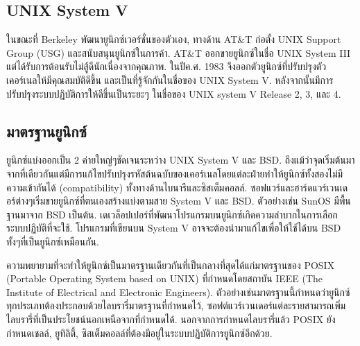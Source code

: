 \begin{thwbr}
{{\subsection{UNIX System V}
ในขณะที่ Berkeley พัฒนายูนิกซ์เวอร์ชั่นของตัวเอง, ทางด้าน AT\&T ก่อตั้ง UNIX Support Group (USG) และสนับสนุนยูนิกซ์ในการค้า. AT\&T ออกขายยูนิกซ์ในชื่อ UNIX System III แต่ได้รับการต้อนรับไม่สู้ดีนักเนื่องจากคุณภาพ. ในปีค.ศ. 1983 จึงออกตัวยูนิกซ์ที่ปรับปรุงตัวเคอร์เนลให้มีคุณสมบัติดีขึ้น และเป็นที่รู้จักกันในชื่อของ UNIX System V. หลังจากนั้นมีการปรับปรุงระบบปฏิบัติการให้ดีขึ้นเป็นระยะๆ ในชื่อของ UNIX system V Release 2, 3, และ 4.


\subsection{มาตรฐานยูนิกซ์}
ยูนิกซ์แบ่งออกเป็น 2 ค่ายใหญ่ๆชัดเจนระหว่าง UNIX System V และ BSD. ถึงแม้ว่าจุดเริ่มต้นมาจากที่เดียวกันแต่มีการแก้ไขปรับปรุงรหัสต้นฉบับของเคอร์เนลโดยแต่ละฝ่ายทำให้ยูนิกซ์ทั้งสองไม่มีความเข้ากันได้ (compatibility) ทั้งทางด้านไบนารีและซิสเต็มคอลล์. ซอฟแวร์และฮาร์ดแวร์เวนเดอร์ต่างๆเริ่มขายยูนิกซ์ที่ตนเองสร้างแบ่งตามสาย System V และ BSD. ตัวอย่างเช่น SunOS มีพื้นฐานมาจาก BSD เป็นต้น. เดเวล็อปเปอร์ที่พัฒนาโปรแกรมบนยูนิกซ์เกิดความลำบากในการเลือกระบบปฏิบัติที่จะใช้. โปรแกรมที่เขียนบน System V อาจจะต้องนำมาแก้ไขเพื่อให้ใช้ได้บน BSD ทั้งๆที่เป็นยูนิกซ์เหมือนกัน. 

ความพยายามที่จะทำให้ยูนิกซ์เป็นมาตรฐานเดียวกันที่เป็นกลางที่สุดได้แก่มาตรฐานของ POSIX (Portable Operating System based on UNIX) ที่กำหนดโดยสถาบัน IEEE (The Institute of Electrical and Electronic Engineers). ตัวอย่างเช่นมาตรฐานนี้กำหนดว่ายูนิกซ์ทุกประเภทต้องประกอบด้วยไลบรารี่มาตรฐานที่กำหนดไว้, ซอฟต์แวร์เวนเดอร์แต่ละรายสามารถเพิ่มไลบรารี่ที่เป็นประโยชน์นอกเหนือจากที่กำหนดได้. นอกจากการกำหนดไลบรารี่แล้ว POSIX ยังกำหนดเชลล์, ยูทิลิตี้, ซิสเต็มคอลล์ที่ต้องมีอยู่ในระบบปฏิบัติการยูนิกซ์อีกด้วย.




}}
\end{thwbr}
